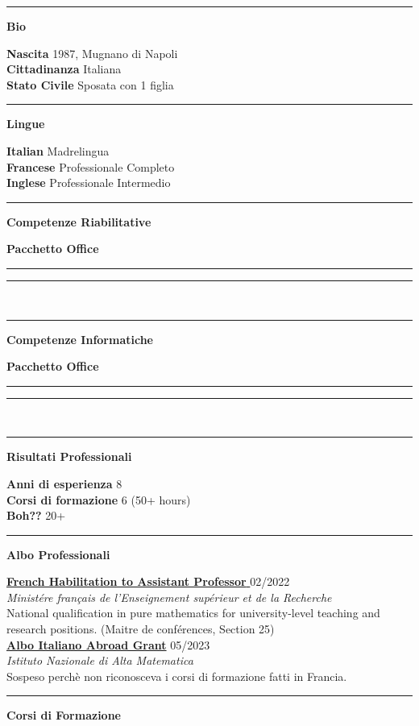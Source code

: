 \documentclass[a4paper]{article}
\newcommand{\crule}[3][black]{\textcolor{#1}{\rule{#2}{#3}}}
\newcommand{\progbar}[4][black]{\crule[#1]{#3}{#4}\crule[#1!10!white!90]{#2}{#4}}
\newcommand{\block}[1]{\hrule \vspace{0.2cm} \textbf{\Large #1} \vspace{0.2cm}}
\newcommand{\voice}[5]{\href{#4}{\textbf{#1}} \hfill #2 \\ \textit{#3} \\ {\small #5} \vspace{0.2cm} \\}
\newcommand{\skill}[2]{\textbf{#1} \hfill #2 \\}
\newcommand{\skillbar}[4]{\textbf{#1} \hfill \progbar{#2}{#3}{#4} \\}
\begin{document}
\begin{minipage}[t]{0.375\columnwidth}
   
    \block{Bio}

	\skill{Nascita}{1987, Mugnano di Napoli}
	\skill{Cittadinanza}{Italiana}
	\skill{Stato Civile}{Sposata con 1 figlia}



    \block{Lingue} 
        
    \skill{Italian}{Madrelingua}
    \skill{Francese}{Professionale Completo}
    \skill{Inglese}{Professionale Intermedio}
        

   \block{Competenze Riabilitative} 
    
    \skillbar{Pacchetto Office}
    {1cm}
    {1cm}
    {0.25cm}




    \block{Competenze Informatiche} 
      
    \skillbar{Pacchetto Office}
    {1cm}
    {1cm}
    {0.25cm}


    \block{Risultati Professionali}

    \skill{Anni di esperienza}{8 }
    \skill{Corsi di formazione}{6 (50+ hours) }
    \skill{Boh??}{20+ }

    
\block{Albo Professionali}

\voice{French Habilitation to Assistant Professor }
  {02/2022}
  {Minist\'ere français de l'Enseignement sup\'erieur et de la Recherche}
  {https://www.galaxie.enseignementsup-recherche.gouv.fr/ensup/qualification/Resultats_2022/qualifies_MCF_2022.pdf}
  {National qualification in pure mathematics for university-level teaching and research positions. (Maitre de conf\'erences, Section 25)}
\voice{Albo Italiano Abroad Grant}
  {05/2023}
  {Istituto Nazionale di Alta Matematica}
  {https://www.altamatematica.it/wp-content/uploads/2022/12/bando-estero-2022-2023-1.pdf}
  {Sospeso perchè non riconosceva i corsi di formazione fatti in Francia.}




\end{minipage}


\clearpage

    \block{Corsi di Formazione}
\end{document}

